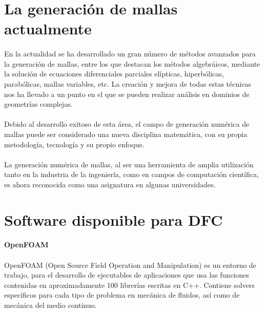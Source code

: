 \documentclass[letterpaper, openright, 12pt]{book}
\begin{document}
        \section{La generación de mallas actualmente}
            \paragraph*{}
                En la actualidad se ha desarrollado un gran número de métodos
                avanzados para la generación de mallas, entre los que destacan
                los métodos algebráicos, mediante la solución de ecuaciones
                diferenciales parciales elípticas, hiperbólicas, parabólicas,
                mallas variables, etc. La creación y mejora de todas estas
                técnicas nos ha llevado a un punto en el que se pueden realizar
                análisis en dominios de geometrías complejas.

            \paragraph*{}
                Debido al desarrollo exitoso de esta área, el campo de
                generación numérica de mallas puede ser considerado una nueva
                disciplina matemática, con su propia metodología, tecnología y
                su propio enfoque.

            \paragraph*{}
                La generación numérica de mallas, al ser una herramienta de
                amplia utilización tanto en la industria de la ingeniería, como
                en campos de computación científica, es ahora reconocida como
                una asignatura en algunas universidades.\cite{liseikin1999grid}

        \section{Software disponible para DFC}
            \paragraph*{OpenFOAM}
            \paragraph*{}
                OpenFOAM (Open Source Field Operation and Manipulation) es un
                entorno de trabajo, para el desarrollo de ejecutables de
                aplicaciones que usa las funciones contenidas en aproximadamente
                100 librerías escritas en C++. Contiene solvers específicos para
                cada tipo de problema en mecánica de fluidos, así como de
                mecánica del medio continuo.\cite{openfoam}
\end{document}

